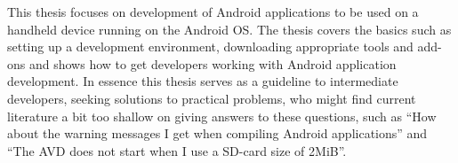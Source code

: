\noindent
This thesis focuses on development of Android applications to be used on a handheld device running on the Android OS. The thesis covers the basics such as setting up a development environment, downloading appropriate tools and add-ons and shows how to get developers working with Android application development. In essence this thesis serves as a guideline to intermediate developers, seeking solutions to practical problems, who might find current literature a bit too shallow on giving answers to these questions, such as “How about the warning messages I get when compiling Android applications” and “The AVD does not start when I use a SD-card size of 2MiB”.